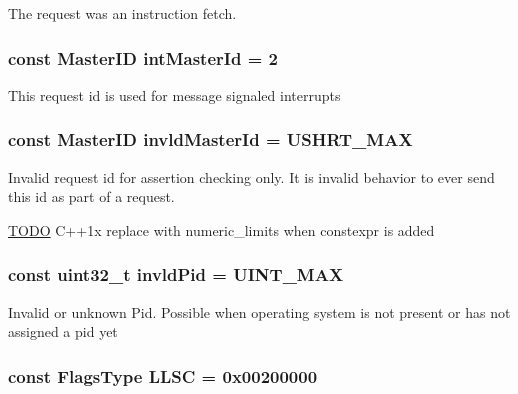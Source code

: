 \label{classRequest_a1137c9aff3d0aa2d9c0fafeb06ec7bc3}
The request was an instruction fetch. \hypertarget{classRequest_a6af77aa9f96123442112081a9248f2e8}{
\subsubsection[{intMasterId}]{\setlength{\rightskip}{0pt plus 5cm}const {\bf MasterID} {\bf intMasterId} = 2}}
\label{classRequest_a6af77aa9f96123442112081a9248f2e8}
This request id is used for message signaled interrupts \hypertarget{classRequest_a1bb5b2ea96370ac4071dbe85cc9883c8}{
\subsubsection[{invldMasterId}]{\setlength{\rightskip}{0pt plus 5cm}const {\bf MasterID} {\bf invldMasterId} = USHRT\_\-MAX}}
\label{classRequest_a1bb5b2ea96370ac4071dbe85cc9883c8}
Invalid request id for assertion checking only. It is invalid behavior to ever send this id as part of a request. \begin{Desc}
\item[\hyperlink{todo__todo000085}{TODO}]C++1x replace with numeric\_\-limits when constexpr is added \end{Desc}
\hypertarget{classRequest_ac5c3b2d7d6e9f98184fbfccb6ffc7273}{
\subsubsection[{invldPid}]{\setlength{\rightskip}{0pt plus 5cm}const {\bf uint32\_\-t} {\bf invldPid} = UINT\_\-MAX}}
\label{classRequest_ac5c3b2d7d6e9f98184fbfccb6ffc7273}
Invalid or unknown Pid. Possible when operating system is not present or has not assigned a pid yet \hypertarget{classRequest_ae940f472047b661a3913d069f9c3bea3}{
\subsubsection[{LLSC}]{\setlength{\rightskip}{0pt plus 5cm}const {\bf FlagsType} {\bf LLSC} = 0x00200000}}
